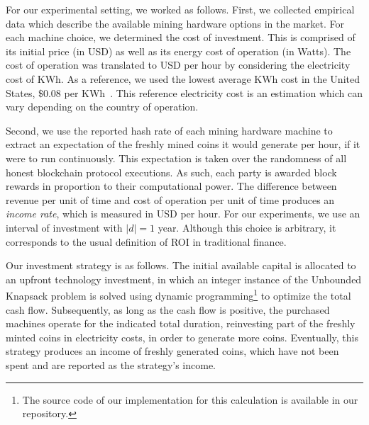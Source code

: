 For our experimental setting, we worked as follows. First, we collected
empirical data which describe the available mining hardware options in the
market. For each machine choice, we determined the cost of investment. This is
comprised of its initial price (in USD) as well as its energy cost of operation
(in Watts). The cost of operation was translated to USD per hour by considering
the electricity cost of KWh. As a reference, we used the lowest average KWh
cost in the United States, \ie $\$0.08$ per KWh~\cite{energy-cost}. This reference electricity cost is an estimation which
can vary depending on the country of operation.

Second, we use the reported hash rate of each mining hardware machine to
extract an expectation of the freshly mined coins it would generate per hour,
if it were to run continuously. This expectation is taken over the randomness
of all honest blockchain protocol executions. As such, each party is awarded
block rewards in proportion to their computational power. The difference
between revenue per unit of time and cost of operation per unit of time
produces an \emph{income rate}, which is measured in USD per hour.
For our experiments, we use an interval of investment with $|d| = 1$ year. Although
this choice is arbitrary, it corresponds to the usual definition of ROI in
traditional finance.

Our investment strategy is as follows. The
initial available capital is allocated to an upfront technology
investment, in which an integer instance of the Unbounded Knapsack problem
\cite{mathews1896partition} is solved using dynamic programming\footnote{The
source code of our implementation for this calculation is available in our
repository.} to optimize the total cash flow.
Subsequently, as long as the cash flow is positive, the purchased machines
operate for the indicated total duration, reinvesting part of the freshly
minted coins in electricity costs, in order to generate more coins. Eventually,
this strategy produces an income of freshly generated coins, which have not
been spent and are reported as the strategy's income.

